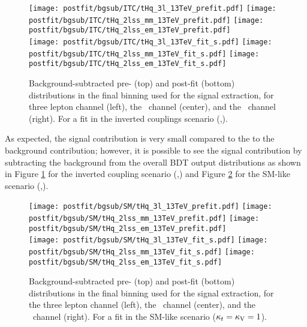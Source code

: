 \begin{figure} [!h]
 \centering
 \texttt{[image: postfit/bgsub/ITC/tHq\_3l\_13TeV\_prefit.pdf]}
 \texttt{[image: postfit/bgsub/ITC/tHq\_2lss\_mm\_13TeV\_prefit.pdf]}
 \texttt{[image: postfit/bgsub/ITC/tHq\_2lss\_em\_13TeV\_prefit.pdf]} \\
 \texttt{[image: postfit/bgsub/ITC/tHq\_3l\_13TeV\_fit\_s.pdf]}
 \texttt{[image: postfit/bgsub/ITC/tHq\_2lss\_mm\_13TeV\_fit\_s.pdf]}
 \texttt{[image: postfit/bgsub/ITC/tHq\_2lss\_em\_13TeV\_fit\_s.pdf]}
\caption[Background-subtracted distributions in the final binning (ITC).]{Background-subtracted pre- (top) and post-fit (bottom) distributions in the final binning used for the signal extraction, for three lepton channel (left), the \mumu\ channel (center), and the \emu\ channel (right). For a fit in the inverted couplings scenario (,).}
\label{fig:postfit_bgsub_ITC}
\end{figure}

As expected, the signal contribution is very small compared to the to the background contribution; however, it is possible to see the signal contribution by subtracting the background from the overall BDT output distributions as shown in Figure \ref{fig:postfit_bgsub_ITC} for the inverted coupling scenario (,) and Figure \ref{fig:postfit_bgsub_SM} for the SM-like scenario (,).  

\begin{figure} [!h]
 \centering
 \texttt{[image: postfit/bgsub/SM/tHq\_3l\_13TeV\_prefit.pdf]}
 \texttt{[image: postfit/bgsub/SM/tHq\_2lss\_mm\_13TeV\_prefit.pdf]}
 \texttt{[image: postfit/bgsub/SM/tHq\_2lss\_em\_13TeV\_prefit.pdf]} \\
 \texttt{[image: postfit/bgsub/SM/tHq\_3l\_13TeV\_fit\_s.pdf]}
 \texttt{[image: postfit/bgsub/SM/tHq\_2lss\_mm\_13TeV\_fit\_s.pdf]}
 \texttt{[image: postfit/bgsub/SM/tHq\_2lss\_em\_13TeV\_fit\_s.pdf]}
\caption[Background-subtracted distributions in the final binning (SM)]{Background-subtracted pre- (top) and post-fit (bottom) distributions in the final binning used for the signal extraction, for the three lepton channel (left), the \mumu\ channel (center), and the \emu\ channel (right). For a fit in the SM-like scenario ($\kappa_t=\kappa_\text{V}=1$).}
\label{fig:postfit_bgsub_SM}
\end{figure}

